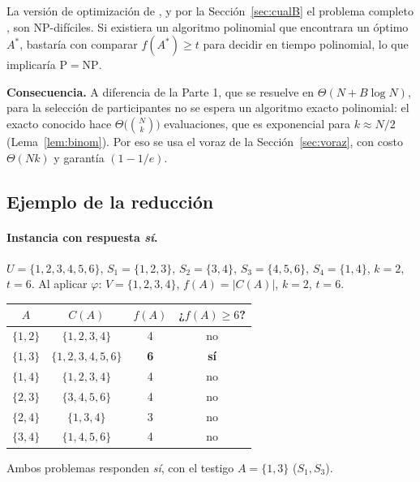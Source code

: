 \begin{corolario}
La versión de optimización de \SEL{}, y por la Sección~\ref{sec:cualB} el problema completo \RED, son NP-difíciles. Si existiera un algoritmo polinomial que encontrara un óptimo $A^*$, bastaría con comparar $f(A^*)\ge t$ para decidir \SEL{} en tiempo polinomial, lo que implicaría $\mathrm{P}=\mathrm{NP}$.
\end{corolario}

\textbf{Consecuencia.} A diferencia de la Parte 1, que se resuelve en $\Theta(N+B\log N)$, para la selección de participantes no se espera un algoritmo exacto polinomial: el exacto conocido hace $\Theta\big(\binom{N}{k}\big)$ evaluaciones, que es exponencial para $k\approx N/2$ (Lema~\ref{lem:binom}). Por eso se usa el voraz de la Sección~\ref{sec:voraz}, con costo $\Theta(Nk)$ y garantía $(1-1/e)$.

\subsection{Ejemplo de la reducción}

\paragraph{Instancia con respuesta \emph{sí}.} $U=\{1,2,3,4,5,6\}$, $S_1=\{1,2,3\}$, $S_2=\{3,4\}$, $S_3=\{4,5,6\}$, $S_4=\{1,4\}$, $k=2$, $t=6$. Al aplicar $\varphi$: $V=\{1,2,3,4\}$, $f(A)=|C(A)|$, $k=2$, $t=6$.

\begin{center}
\begin{tabular}{cccc}
\toprule
\rowcolor{uccielo} $A$ & $C(A)$ & $f(A)$ & ¿$f(A)\ge 6$? \\
\midrule
$\{1,2\}$ & $\{1,2,3,4\}$ & 4 & no \\
$\{1,3\}$ & $\{1,2,3,4,5,6\}$ & \textbf{6} & \textbf{sí} \\
$\{1,4\}$ & $\{1,2,3,4\}$ & 4 & no \\
$\{2,3\}$ & $\{3,4,5,6\}$ & 4 & no \\
$\{2,4\}$ & $\{1,3,4\}$ & 3 & no \\
$\{3,4\}$ & $\{1,4,5,6\}$ & 4 & no \\
\bottomrule
\end{tabular}
\end{center}

Ambos problemas responden \emph{sí}, con el testigo $A=\{1,3\}$ ($S_1,S_3$).

